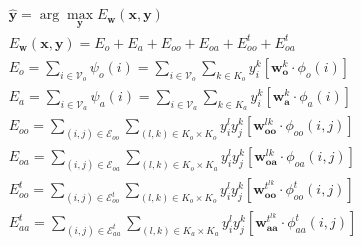 \documentclass{article} %
\begin{document}

%
\begin{gather}
\hat{\mathbf{y}} = \arg\!\max_{\mathbf{y}} E_{\mathbf{w}} (\mathbf{x},
\mathbf{y})\\
E_{\mathbf{w}} (\mathbf{x}, \mathbf{y}) = E_o + E_a + E_{oo} + E_{oa}
+ E^t_{oo} + E^t_{oa} \\
E_o = \sum\limits_{i \in \mathcal{V}_o} \psi_o(i) = \sum\limits_{i \in
\mathcal{V}_o} \sum\limits_{k \in K_o}y^k_i \left[
\mathbf{w}^k_{\mathbf{o}} \cdot \phi_o(i) \right] \\
E_a = \sum\limits_{i \in \mathcal{V}_a} \psi_a(i) = \sum\limits_{i \in
\mathcal{V}_a} \sum\limits_{k \in K_a}y^k_i \left[
\mathbf{w}^k_{\mathbf{a}} \cdot \phi_a(i) \right] \\
E_{oo} = \sum\limits_{(i,j) \in \mathcal{E}_{oo}} \sum\limits_{(l,k)
\in K_o \times K_o} y^l_i y^k_j \left[ \mathbf{w}^{lk}_{\mathbf{oo}}
\cdot \phi_{oo}(i,j) \right] \\
E_{oa} = \sum\limits_{(i,j) \in \mathcal{E}_{oa}} \sum\limits_{(l,k)
\in K_o \times K_a} y^l_i y^k_j \left[ \mathbf{w}^{lk}_{\mathbf{oa}}
\cdot \phi_{oa}(i,j) \right] \\
E^t_{oo} = \sum\limits_{(i,j) \in \mathcal{E}^t_{oo}}
\sum\limits_{(l,k) \in K_o \times K_o} y^l_i y^k_j \left[
\mathbf{w}^{t^{lk}}_{\mathbf{oo}} \cdot \phi^t_{oo}(i,j) \right] \\
E^t_{aa} = \sum\limits_{(i,j) \in \mathcal{E}^t_{aa}}
\sum\limits_{(l,k) \in K_a \times K_a} y^l_i y^k_j \left[
\mathbf{w}^{t^{lk}}_{\mathbf{aa}} \cdot \phi^t_{aa}(i,j) \right]
\end{gather}
\end{document}
